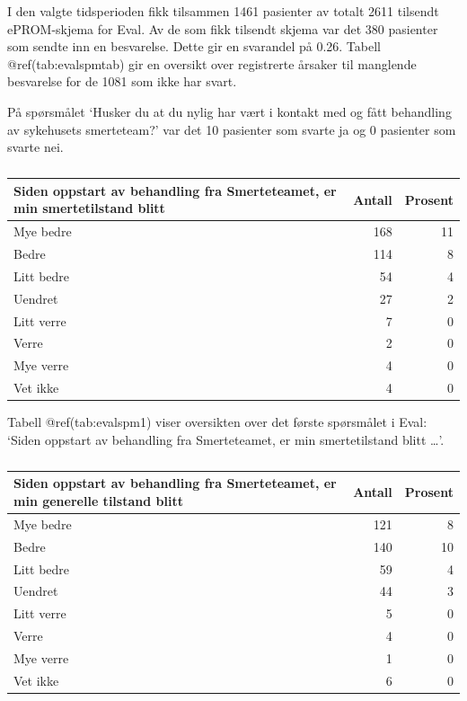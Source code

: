\documentclass[
]{article}
\begin{document}
I den valgte tidsperioden fikk tilsammen 1461 pasienter av totalt 2611
tilsendt ePROM-skjema for Eval. Av de som fikk tilsendt skjema var det
380 pasienter som sendte inn en besvarelse. Dette gir en svarandel på
0.26. Tabell @ref(tab:evalspmtab) gir en oversikt over registrerte
årsaker til manglende besvarelse for de 1081 som ikke har svart.

På spørsmålet `Husker du at du nylig har vært i kontakt med og fått
behandling av sykehusets smerteteam?' var det 10 pasienter som svarte ja
og 0 pasienter som svarte nei.

\begin{table}

\caption{\label{tab:evalspm1}}
\centering
\begin{tabular}[t]{l|r|r}
\hline
Siden oppstart av behandling fra Smerteteamet, er min smertetilstand blitt & Antall  & Prosent\\
\hline
Mye bedre & 168 & 11\\
\hline
Bedre & 114 & 8\\
\hline
Litt bedre & 54 & 4\\
\hline
Uendret & 27 & 2\\
\hline
Litt verre & 7 & 0\\
\hline
Verre & 2 & 0\\
\hline
Mye verre & 4 & 0\\
\hline
Vet ikke & 4 & 0\\
\hline
\end{tabular}
\end{table}

Tabell @ref(tab:evalspm1) viser oversikten over det første spørsmålet i
Eval: `Siden oppstart av behandling fra Smerteteamet, er min
smertetilstand blitt \ldots{}'.

\begin{table}

\caption{\label{tab:evalspm2}}
\centering
\begin{tabular}[t]{l|r|r}
\hline
Siden oppstart av behandling fra Smerteteamet, er min generelle tilstand blitt & Antall  & Prosent\\
\hline
Mye bedre & 121 & 8\\
\hline
Bedre & 140 & 10\\
\hline
Litt bedre & 59 & 4\\
\hline
Uendret & 44 & 3\\
\hline
Litt verre & 5 & 0\\
\hline
Verre & 4 & 0\\
\hline
Mye verre & 1 & 0\\
\hline
Vet ikke & 6 & 0\\
\hline
\end{tabular}
\end{table}
\end{document}
